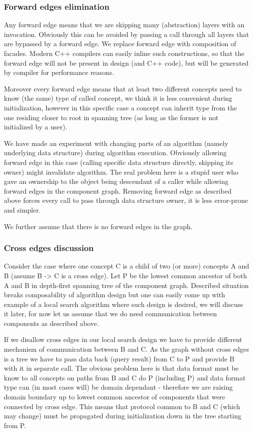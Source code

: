 \subsubsection{Forward edges elimination}
Any forward edge means that we are skipping many (abstraction) layers with an
invocation. Obviously this can be avoided by passing a call through all layers
that are bypassed by a forward edge. We replace forward edge with composition
of facades. Modern C++ compilers can easily inline such constructions, so that
the forward edge will not be present in design (and C++ code), but will be
generated by compiler for performance reasons.

Moreover every forward edge means that at least two different concepts need to
know (the same) type of called concept, we think it is less convenient during
initialization, however in this specific case a concept can inherit type from
the one residing closer to root in spanning tree (as long as the former is not
initialized by a user).

We have made an experiment with changing parts of an algorithm (namely
underlying data structure) during algorithm execution. Obviously allowing
forward edge in this case (calling specific data structure directly, skipping
its owner) might invalidate algorithm. The real problem here is a stupid user
who gave an ownership to the object being descendant of a caller while allowing
forward edges in the component graph. Removing forward edge as described above
forces every call to pass through data structure owner, it is less error-prone
and simpler.

We further assume that there is no forward edges in the graph.

\subsubsection{Cross edges discussion}
Consider the case where one concept C is a child of two (or more) concepts A
and B (assume B -> C is a cross edge). Let P be the lowest common ancestor of
both A and B in depth-first spanning tree of the component graph. Described
situation breaks composability of algorithm design but one can easily come up
with example of a local search algorithm where such design is desired, we will
discuss it later, for now let us assume that we do need communication between
components as described above.

If we disallow cross edges in our local search design we have to provide
different mechanism of communication between B and C. As the graph without
cross edges is a tree we have to pass data back (query result) from C to P and
provide B with it in separate call. The obvious problem here is that data
format must be know to all concepts on paths from B and C do P (including P)
and data format type can (in most cases will) be domain dependant - therefore
we are raising domain boundary up to lowest common ancestor of components that
were connected by cross edge. This means that protocol common to B and C (which
may change) must be propagated during initialization down in the tree starting
from P.

